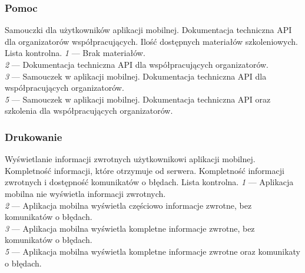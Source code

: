 \documentclass[10pt]{dokument-ppi}
\begin{document}
\subsubsection{Pomoc}
\begin{requirement}
    \desc%
        Samouczki dla użytkowników aplikacji mobilnej. Dokumentacja techniczna
        API dla organizatorów współpracujących.
    \metric%
        Ilość dostępnych materiałów szkoleniowych.
    \tool%
        Lista kontrolna.
    \scale%
        \emph{1} --- Brak materiałów.\\
        \emph{2} --- Dokumentacja techniczna API dla współpracujących
            organizatorów.\\
        \emph{3} --- Samouczek w aplikacji mobilnej. Dokumentacja techniczna API
            dla współpracujących organizatorów.\\
        \emph{5} --- Samouczek w aplikacji mobilnej. Dokumentacja techniczna API
            oraz szkolenia dla współpracujących organizatorów.
\end{requirement}

\subsubsection{Drukowanie}
\begin{requirement}
    \desc%
        Wyświetlanie informacji zwrotnych użytkownikowi aplikacji mobilnej.
        Kompletność informacji, które otrzymuje od serwera.
    \metric%
        Kompletność informacji zwrotnych i dostępność komunikatów o błędach.
    \tool%
        Lista kontrolna.
    \scale%
        \emph{1} --- Aplikacja mobilna nie wyświetla informacji zwrotnych.\\
        \emph{2} --- Aplikacja mobilna wyświetla częściowo informacje zwrotne,
            bez komunikatów o błędach.\\
        \emph{3} --- Aplikacja mobilna wyświetla kompletne informacje zwrotne,
            bez komunikatów o błędach.\\
        \emph{5} --- Aplikacja mobilna wyświetla kompletne informacje zwrotne
        oraz komunikaty o błędach.
\end{requirement}
\end{document}
